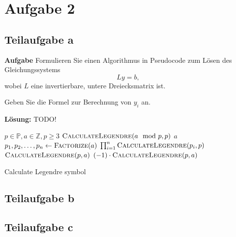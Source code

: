 \section*{Aufgabe 2}
\subsection*{Teilaufgabe a}
\textbf{Aufgabe}
Formulieren Sie einen Algorithmus in Pseudocode zum Lösen des Gleichungssystems
\[Ly = b,\]
wobei $L$ eine invertierbare, untere Dreiecksmatrix ist.

Geben Sie die Formel zur Berechnung von $y_i$ an.

\textbf{Lösung:} TODO! %

   \begin{algorithm}[H]
        \begin{algorithmic}
        \Require $p \in \mathbb{P}, a \in \mathbb{Z}, p \geq 3$
				\State \Return $\Call{CalculateLegendre}{a \mod p, p}$ 
				\State \Return $a$ 
			 
					\State {}
				\Else
					\State {}
				\EndIf	{}
			 
					\State {}
				\Else
					\State {}
				\EndIf {}
			 
				\State $p_1, p_2, \dots, p_n \gets \Call{Factorize}{a}$
				\State \Return $\prod_{i=1}^n \Call{CalculateLegendre}{p_i, p}$ 
			\Else {}
					\State \Return $\Call{CalculateLegendre}{p, a}$
				\Else
					\State \Return $(-1) \cdot \Call{CalculateLegendre}{p, a}$
				\EndIf
			\EndIf
		\EndProcedure
        \end{algorithmic}
    \caption{Calculate Legendre symbol}
    \label{alg:calculateLegendreSymbol}
    \end{algorithm}

\subsection*{Teilaufgabe b}
\subsection*{Teilaufgabe c}
